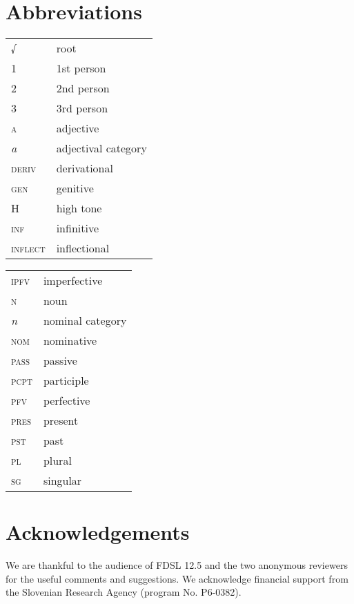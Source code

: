 \documentclass[output=paper, colorlinks, citecolor=brown, newtxmath]{langsci/langscibook}
\begin{document}
\section*{Abbreviations}


\begin{tabularx}{.45\textwidth}{@{}lX@{}}
\textsc{\textsc{√}}&root\\
\textsc{1}&1st person\\
\textsc{2}&2nd person\\
\textsc{3}&3rd person\\
\textsc{a}&{adjective}\\
\textit{\textit{a}}&{adjectival} category\\
\textsc{deriv}&{derivational}\\
\textsc{gen}&genitive\\
\textsc{H}&{high tone}\\
\textsc{inf}&{infinitive}\\
\textsc{inflect}&{inflectional}\\
\end{tabularx}
\begin{tabularx}{.45\textwidth}{@{}lX@{}}
\textsc{\textsc{ipfv}}&{imperfective}\\
\textsc{n}&noun\\
\textit{\textit{n}}&nominal category\\
\textsc{nom}&nominative\\
\textsc{\textsc{pass}}&passive\\
\textsc{\textsc{pcpt}}&{participle}\\
\textsc{\textsc{pfv}}&{perfective}\\
\textsc{\textsc{pres}}&present\\
\textsc{\textsc{pst}}&past\\
\textsc{pl}&plural\\
\textsc{sg}&singular\\
\end{tabularx}

\section*{Acknowledgements}

We are thankful to the audience of FDSL 12.5 and the two anonymous reviewers for the useful comments and suggestions. We acknowledge financial support from the Slovenian Research Agency (program No. P6-0382).


\sloppy
\printbibliography[heading=subbibliography,notkeyword=this]
\end{document}

